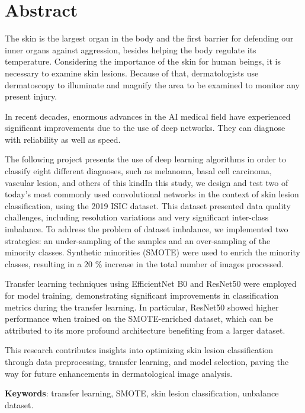 \chapter*{Abstract}

\onehalfspacing

The skin is the largest organ in the body and the first barrier for defending our inner organs against aggression, besides helping the body regulate its temperature. Considering the importance of the skin for human beings, it is necessary to examine skin lesions. Because of that, dermatologists use dermatoscopy to illuminate and magnify the area to be examined to monitor any present injury.  

In recent decades, enormous advances in the AI medical field have experienced significant improvements due to the use of deep networks. They can diagnose with reliability as well as speed. 

The following project presents the use of deep learning algorithms in order to classify eight different diagnoses, such as melanoma, basal cell carcinoma, vascular lesion, and others of this kindIn this study, we design and test two of today's most commonly used convolutional networks in the context of skin lesion classification, using the 2019 ISIC dataset. This dataset presented data quality challenges, including resolution variations and very significant inter-class imbalance. To address the problem of dataset imbalance, we implemented two strategies: an under-sampling of the samples and an over-sampling of the minority classes. Synthetic minorities (SMOTE) were used to enrich the minority classes, resulting in a 20 \% increase in the total number of images processed.

Transfer learning techniques using EfficientNet B0 and ResNet50 were employed for model training, demonstrating significant improvements in classification metrics during the transfer learning. In particular, ResNet50 showed higher performance when trained on the SMOTE-enriched dataset, which can be attributed to its more profound architecture benefiting from a larger dataset.

This research contributes insights into optimizing skin lesion classification through data preprocessing, transfer learning, and model selection, paving the way for future enhancements in dermatological image analysis.



\vspace{1.5cm}

\textbf{Keywords}: transfer learning, SMOTE, skin lesion classification, unbalance dataset.
